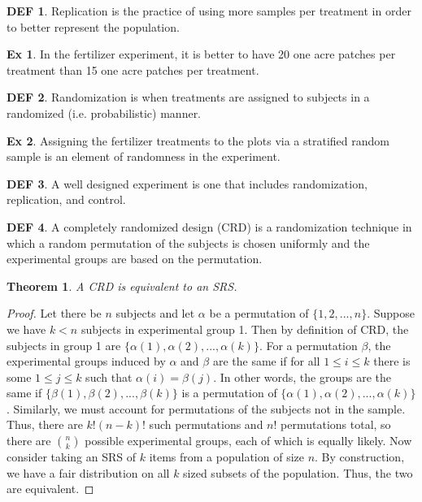 \documentclass{article}
\newtheorem{theorem}{Theorem}
\theoremstyle{definition}\newtheorem{definition}{DEF}
\theoremstyle{definition}\newtheorem{example}{Ex}
\theoremstyle{lemma}\newtheorem{lemma}{Lemma}
\theoremstyle{corrolary}\newtheorem{corrolary}{Cor}
\begin{document}
\begin{definition}
Replication is the practice of using more samples per treatment in order to better represent the population.
\end{definition}

\begin{example}
In the fertilizer experiment, it is better to have 20 one acre patches per treatment than 15 one acre patches per treatment.
\end{example}

\begin{definition}
Randomization is when treatments are assigned to subjects in a randomized (i.e. probabilistic) manner.
\end{definition}

\begin{example}
Assigning the fertilizer treatments to the plots via a stratified random sample is an element of randomness in the experiment.
\end{example}

\begin{definition}
A well designed experiment is one that includes randomization, replication, and control.
\end{definition}

\begin{definition}
A completely randomized design (CRD) is a randomization technique in which a random permutation of the subjects is chosen uniformly and the experimental groups are based on the permutation.
\end{definition}

\begin{theorem}
A CRD is equivalent to an SRS.
\end{theorem}
\begin{proof}
Let there be $n$ subjects and let $\alpha$ be a permutation of $\{1, 2, ..., n\}$.
Suppose we have $k<n$ subjects in experimental group 1.
Then by definition of CRD, the subjects in group 1 are $\{\alpha (1), \alpha(2), ..., \alpha (k)\}$.
For a permutation $\beta$, the experimental groups induced by $\alpha$ and $\beta$ are the same if for all $1\leq i \leq k$ there is some $1 \leq j \leq k$ such that $\alpha (i) = \beta(j)$.
In other words, the groups are the same if $\{\beta (1), \beta (2), ..., \beta (k)\}$ is a permutation of $\{\alpha (1), \alpha(2), ..., \alpha (k)\}$.
Similarly, we must account for permutations of the subjects not in the sample.
Thus, there are $k! (n-k)!$ such permutations and $n!$ permutations total, so there are $\binom{n}{k}$ possible experimental groups, each of which is equally likely.
Now consider taking an SRS of $k$ items from a population of size $n$.
By construction, we have a fair distribution on all $k$ sized subsets of the population.
Thus, the two are equivalent.
\end{proof}
\end{document}
